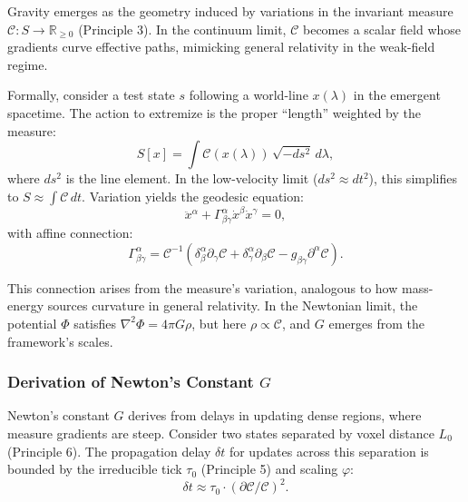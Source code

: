 \documentclass[twocolumn,prd,amsmath,amssymb,aps,superscriptaddress,nofootinbib]{revtex4-2}
\begin{document}
Gravity emerges as the geometry induced by variations in the invariant measure $\mathcal{C}: S \to \mathbb{R}_{\geq 0}$ (Principle 3). In the continuum limit, $\mathcal{C}$ becomes a scalar field whose gradients curve effective paths, mimicking general relativity in the weak-field regime.

Formally, consider a test state $s$ following a world-line $x(\lambda)$ in the emergent spacetime. The action to extremize is the proper ``length'' weighted by the measure:
\begin{equation}
S[x] = \int \mathcal{C}(x(\lambda)) \, \sqrt{-ds^2} \, d\lambda,
\label{eq:action-measure}
\end{equation}
where $ds^2$ is the line element. In the low-velocity limit ($ds^2 \approx dt^2$), this simplifies to $S \approx \int \mathcal{C} \, dt$. Variation yields the geodesic equation:
\begin{equation}
\ddot{x}^\alpha + \Gamma^\alpha_{\beta\gamma} \dot{x}^\beta \dot{x}^\gamma = 0,
\label{eq:geodesic}
\end{equation}
with affine connection:
\begin{equation}
\Gamma^\alpha_{\beta\gamma} = \mathcal{C}^{-1} \left( \delta^\alpha_\beta \partial_\gamma \mathcal{C} + \delta^\alpha_\gamma \partial_\beta \mathcal{C} - g_{\beta\gamma} \partial^\alpha \mathcal{C} \right).
\label{eq:connection}
\end{equation}

This connection arises from the measure's variation, analogous to how mass-energy sources curvature in general relativity. In the Newtonian limit, the potential $\Phi$ satisfies $\nabla^2 \Phi = 4\pi G \rho$, but here $\rho \propto \mathcal{C}$, and $G$ emerges from the framework's scales.

\subsubsection{Derivation of Newton's Constant $G$}
\label{subsubsec:derive-G}

Newton's constant $G$ derives from delays in updating dense regions, where measure gradients are steep. Consider two states separated by voxel distance $L_0$ (Principle 6). The propagation delay $\delta t$ for updates across this separation is bounded by the irreducible tick $\tau_0$ (Principle 5) and scaling $\varphi$:
\[
\delta t \approx \tau_0 \cdot (\partial \mathcal{C} / \mathcal{C})^2.
\]
\end{document}
